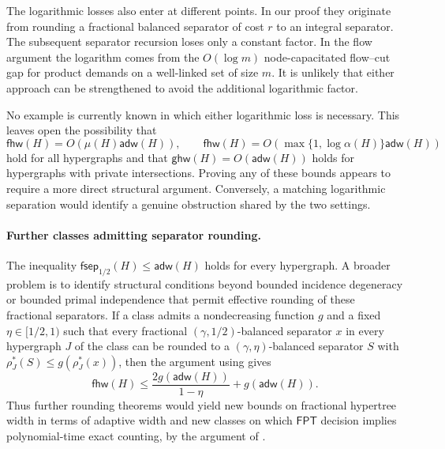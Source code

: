 \documentclass[11pt,letterpaper]{article}
\theoremstyle{definition}
\theoremstyle{remark}
\newcommand{\ghw}{\mathsf{ghw}}
\newcommand{\fhw}{\mathsf{fhw}}
\newcommand{\adw}{\mathsf{adw}}
\newcommand{\fsep}{\mathsf{fsep}}
\newcommand{\FPT}{\ensuremath{\mathsf{FPT}}}
\newif\ifaidisclosure
\providecommand{\adw}{\operatorname{adw}}
\providecommand{\fhw}{\operatorname{fhw}}
\providecommand{\FPT}{\ensuremath{\mathsf{FPT}}}
\begin{document}
The logarithmic losses also enter at different points. In our proof they
originate from rounding a fractional balanced separator of cost $r$
to an integral separator.  The subsequent separator recursion loses only a
constant factor. In the flow argument the logarithm comes from the
$O(\log m)$ node-capacitated flow--cut gap for product demands on a
well-linked set of size $m$. It is unlikely that either approach can be strengthened to avoid the additional logarithmic factor.

No example is currently known in which either logarithmic loss is
necessary. This leaves open the possibility that
\[
 \fhw(H)=O(\mu(H)\adw(H)),
 \qquad
 \fhw(H)=O(\max\{1,\log\alpha(H)\}\adw(H))
\]
hold for all hypergraphs and that
\(
 \ghw(H)=O(\adw(H))
\)
holds for hypergraphs with private intersections. Proving any of these bounds
appears to require a more direct structural argument. Conversely, a
matching logarithmic separation would identify a genuine obstruction
shared by the two settings.

\paragraph{Further classes admitting separator rounding.}
The inequality $\fsep_{1/2}(H)\le\adw(H)$ holds for every hypergraph.
A broader problem is to identify structural conditions beyond bounded
incidence degeneracy or bounded primal independence that permit effective
rounding of these fractional separators.
If a class admits a nondecreasing
function $g$ and a fixed $\eta\in[1/2,1)$ such that every fractional
$(\gamma,1/2)$-balanced separator $x$ in every hypergraph
$J$ of the class can be rounded to a $(\gamma,\eta)$-balanced separator $S$ with
$\rho_J^*(S)\le g(\rho_J^*(x))$, then the argument using
 gives
\[
 \fhw(H)\le\frac{2g(\adw(H))}{1-\eta}+g(\adw(H)).
\]
Thus further rounding theorems would yield new bounds on fractional
hypertree width in terms of adaptive width and new classes on which \FPT{}
decision implies polynomial-time exact counting, by the argument of
.

%
%
%
%
%
%
%
%
%
%
%
%
%
%
%

%
%
%
%
%
%
%
%
%
%
%
%
%
%
%
%
%
%
%
%
%
%

%
\ifaidisclosure
\end{document}
